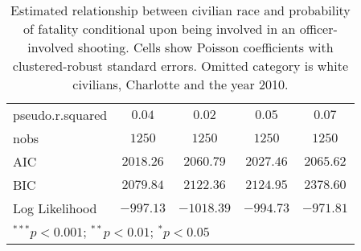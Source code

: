 \begin{table}[ht!]
\begin{center}
\begin{tabular}{l c c c c}
\midrule
pseudo.r.squared           & $0.04$       & $0.02$        & $0.05$       & $0.07$         \\
nobs                       & $1250$       & $1250$        & $1250$       & $1250$         \\
AIC                        & $2018.26$    & $2060.79$     & $2027.46$    & $2065.62$      \\
BIC                        & $2079.84$    & $2122.36$     & $2124.95$    & $2378.60$      \\
Log Likelihood             & $-997.13$    & $-1018.39$    & $-994.73$    & $-971.81$      \\
\bottomrule
\multicolumn{5}{l}{\scriptsize{$^{***}p<0.001$; $^{**}p<0.01$; $^{*}p<0.05$}}
\end{tabular}
\caption{Estimated relationship between civilian race and probability of fatality conditional upon being involved in an officer-involved shooting. Cells show Poisson coefficients with clustered-robust standard errors. Omitted category is white civilians, Charlotte and the year 2010.}
\label{tab:poisson_FE}
\end{center}
\end{table}
